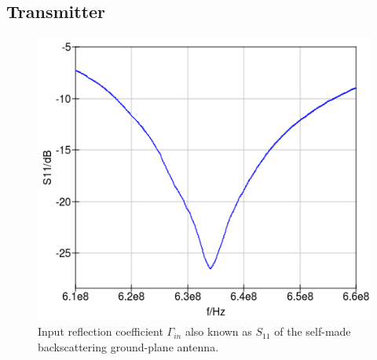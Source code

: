 \documentclass[conference]{IEEEtran}
\begin{document}
\subsection{Transmitter}
\begin{figure}[h]
\centering
\includegraphics[width=0.8\columnwidth]{./fig/s11v2}
\caption{Input reflection coefficient \ensuremath{\Gamma_{in}} also known as \ensuremath{S_{\text{11}}} of the self-made backscattering ground-plane antenna.}
\label{fig:s11}
\end{figure}
\end{document}
